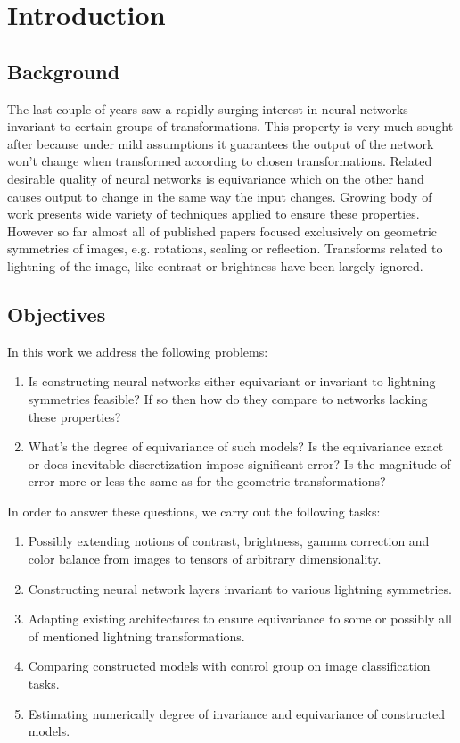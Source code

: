 \section{Introduction}
\subsection{Background}
The last couple of years saw a rapidly surging interest in neural networks
invariant to certain groups of transformations. This property
is very much sought after because under mild assumptions it
guarantees the output of the network won't change when transformed according to
chosen
transformations. Related desirable quality of neural networks is equivariance
which on the other hand causes output to change in the same way the input
changes. Growing body of work presents wide variety of
techniques applied to ensure these properties.
\\ However so far almost all of published papers focused exclusively on
geometric symmetries of images, e.g. rotations, scaling or reflection. Transforms
related to lightning of the image, like contrast or brightness have been largely
ignored.
\subsection{Objectives}
In this work we address the following problems:
\begin{enumerate}
    \item Is constructing neural networks either equivariant or invariant to
        lightning symmetries feasible? If so then how do they compare to networks
        lacking these properties?
    \item What's the degree of equivariance of such models? Is the equivariance
        exact or does inevitable discretization impose significant error?
        Is the magnitude of error more or less the same
        as for the geometric transformations?
\end{enumerate}
In order to answer these questions, we carry out the following tasks:
\begin{enumerate}
    \item Possibly extending notions of contrast, brightness, gamma correction
        and color balance from
        images to tensors of arbitrary dimensionality.
    \item Constructing neural network layers invariant to various lightning
        symmetries.
    \item Adapting existing architectures to ensure equivariance to some or
        possibly all of mentioned lightning transformations.
    \item Comparing constructed models with control group on image
        classification tasks.
    \item Estimating numerically degree of invariance and equivariance of constructed models.
\end{enumerate}
